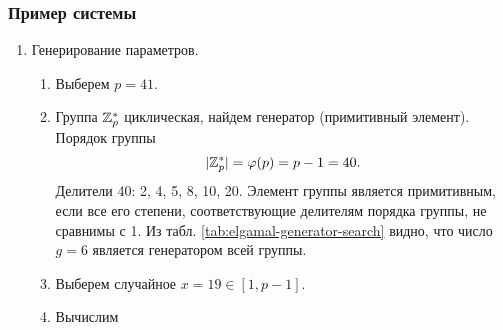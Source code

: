 \subsubsection{Пример системы}

\begin{enumerate}
    \item Генерирование параметров.
        \begin{enumerate}
            \item Выберем $p=41$.
            \item Группа $\mathbb{Z}_p^*$ циклическая, найдем генератор (примитивный элемент). Порядок группы
                \[ |\mathbb{Z}_p^*| = \varphi(p) = p-1 = 40. \]
                Делители 40: 2, 4, 5, 8, 10, 20. Элемент группы является примитивным, если все его степени, соответствующие делителям порядка группы, не сравнимы с 1. Из табл. \ref{tab:elgamal-generator-search} видно, что число $g = 6$ является генератором всей группы.
                \begin{table}[!ht]
                    \centering
                    \caption{Поиск генератора в циклической группе $\Z_{41}^*$. Элемент 6 -- генератор\label{tab:elgamal-generator-search}}
                \end{table}
            \item Выберем случайное $x = 19 \in [1, p-1]$.
            \item Вычислим
                \[ \begin{array}{ll}

\end{array}\]
\end{enumerate}
\end{enumerate}
